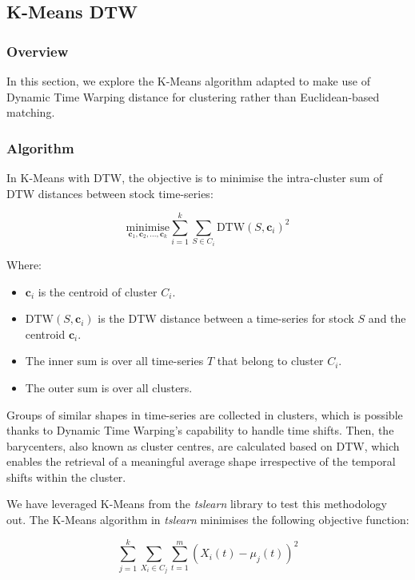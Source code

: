 \documentclass[11pt]{article}
\begin{document}
\subsection{K-Means DTW}
\subsubsection{Overview}

In this section, we explore the K-Means algorithm adapted to make use of Dynamic Time Warping distance for clustering rather than Euclidean-based matching. 

\subsubsection{Algorithm}

In K-Means with DTW, the objective is to minimise the intra-cluster sum of DTW distances between stock time-series:


\begin{equation}
\underset{\mathbf{c}_1, \mathbf{c}_2, ..., \mathbf{c}_k}{\text{minimise}} \sum_{i=1}^{k} \sum_{S \in C_i} \text{DTW}(S, \mathbf{c}_i)^2
\end{equation}

Where:
\begin{itemize}
    \item \( \mathbf{c}_i \) is the centroid of cluster \( C_i \).
    \item \( \text{DTW}(S, \mathbf{c}_i) \) is the DTW distance between a time-series for stock \( S \) and the centroid \( \mathbf{c}_i \).
    \item The inner sum is over all time-series \( T \) that belong to cluster \( C_i \).
    \item The outer sum is over all clusters.
\end{itemize}

Groups of similar shapes in time-series are collected in clusters, which is possible thanks to Dynamic Time Warping's capability to handle time shifts. Then, the barycenters, also known as cluster centres, are calculated based on DTW, which enables the retrieval of a meaningful average shape irrespective of the temporal shifts within the cluster. 


We have leveraged K-Means from the \textit{tslearn} library \cite{tslearnclustering} to test this methodology out. The K-Means algorithm in \textit{tslearn} minimises the following objective function:

$$\sum_{j=1}^k \sum_{X_i \in C_j} \sum_{t=1}^m (X_i(t) - \mu_j(t))^2$$
\end{document}
